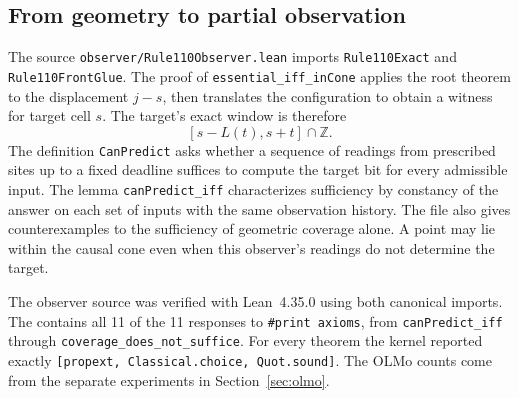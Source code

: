 \subsection{From geometry to partial observation}
The source \texttt{observer/Rule110Observer.lean} imports \texttt{Rule110Exact} and \texttt{Rule110FrontGlue}. The proof of \texttt{essential\_iff\_inCone} applies the root theorem to the displacement $j-s$, then translates the configuration to obtain a witness for target cell $s$. The target's exact window is therefore
\[
  [s-L(t),s+t]\cap\mathbb Z.
\]
The definition \texttt{CanPredict} asks whether a sequence of readings from prescribed sites up to a fixed deadline suffices to compute the target bit for every admissible input. The lemma \texttt{canPredict\_iff} characterizes sufficiency by constancy of the answer on each set of inputs with the same observation history. The file also gives counterexamples to the sufficiency of geometric coverage alone. A point may lie within the causal cone even when this observer's readings do not determine the target.

The observer source was verified with Lean~4.35.0 using both canonical imports. The  contains all 11 of the 11 responses to \texttt{\#print axioms}, from \texttt{canPredict\_iff} through \texttt{coverage\_does\_not\_suffice}. For every theorem the kernel reported exactly \texttt{[propext, Classical.choice, Quot.sound]}. The OLMo counts come from the separate experiments in Section~\ref{sec:olmo}.
